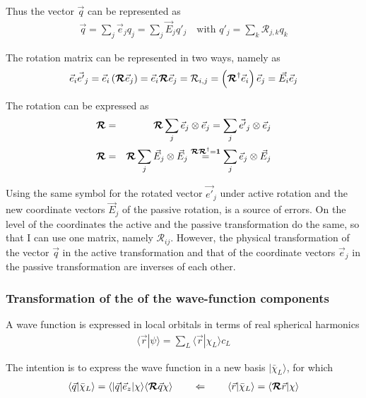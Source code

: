 \documentclass[11pt,a4paper]{report}
\begin{document}
Thus the vector $\vec{q}$ can be represented as
\begin{eqnarray}
\vec{q}=\sum_j\vec{e}_j q_j=\sum_j\vec{E}_j q'_j
\quad\text{with $q'_j=\sum_k\mathcal{R}_{j,k}q_k$}
\end{eqnarray}

The rotation matrix can be represented in two ways, namely as
\begin{eqnarray}
\vec{e}_i\vec{e'}_j
=\vec{e}_i\left(\bm{\mathcal{R}}\vec{e}_j\right)
=\vec{e}_i\bm{\mathcal{R}}\vec{e}_j
=\mathcal{R}_{i,j}
=\left(\bm{\mathcal{R}}^\dagger\vec{e}_i\right)\vec{e}_j
=\vec{E_i}\vec{e}_j
\end{eqnarray}

The rotation can be expressed as
\begin{eqnarray}
\bm{\mathcal{R}}
&=&\bm{\mathcal{R}}\sum_j \vec{e}_j\otimes\vec{e}_j
=\sum_j \vec{e'}_j\otimes\vec{e}_j
\nonumber\\
\bm{\mathcal{R}}
&=&\bm{\mathcal{R}}\sum_j \vec{E}_j\otimes\vec{E}_j
\stackrel{\bm{\mathcal{R}}\bm{\mathcal{R}}^\dagger=\bm{1}}{=}
\sum_j \vec{e}_j\otimes\vec{E}_j
\end{eqnarray}

Using the same symbol for the rotated vector $\vec{e'}_j$ under active
rotation and the new coordinate vectors $\vec{E}_j$ of the passive
rotation, is a source of errors. On the level of the coordinates the
active and the passive transformation do the same, so that I can use
one matrix, namely $\mathcal{R}_{ij}$. However, the physical
transformation of the vector $\vec{q}$ in the active transformation
and that of the coordinate vectors $\vec{e}_j$ in the passive
transformation are inverses of each other.


\subsubsection{Transformation of the of the wave-function components}
A wave function is expressed in local orbitals in terms of
real spherical harmonics
\begin{eqnarray}
\langle\vec{r}|\psi\rangle=\sum_L\langle\vec{r}|\chi_L\rangle c_L
\end{eqnarray}

The intention is to express the wave function in a new basis
$|\bar{\chi}_L\rangle$, for which
\begin{eqnarray}
\langle\vec{q}|\bar{\chi}_L\rangle=
\langle|\vec{q}|\vec{e}_z|\chi\rangle
\langle\bm{\mathcal{R}}\vec{q}\chi\rangle
\qquad\Leftarrow\qquad
\langle\vec{r}|\bar{\chi}_L\rangle=\langle\bm{\mathcal{R}}\vec{r}|\chi\rangle
\end{eqnarray}
\end{document}

